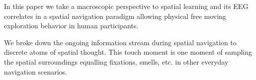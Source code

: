 In this paper we take a macroscopic perspective to spatial learning and its EEG correlates in a spatial navigation paradigm allowing physical free moving exploration behavior in human participants.

We broke down the ongoing information stream during spatial navigation to discrete atoms of spatial thought. This touch moment is one moment of sampling the spatial surroundings equalling fixations, smells, etc. in other everyday navigation scenarios.

